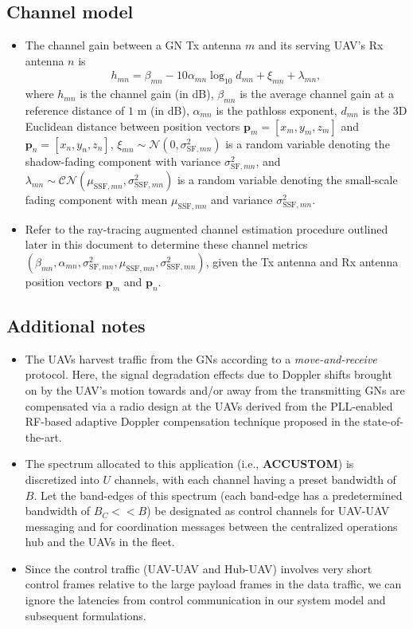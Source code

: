 \documentclass{article}
\begin{document}
\subsection{Channel model}
\begin{itemize}
    \item The channel gain between a GN Tx antenna $m$ and its serving UAV's Rx antenna $n$ is
    \begin{align}\label{Channel}
        h_{mn}{=}\beta_{mn}{-}10\alpha_{mn}\log_{10}d_{mn}{+}\xi_{mn}{+}\lambda_{mn},
    \end{align}
    where $h_{mn}$ is the channel gain (in dB), $\beta_{mn}$ is the average channel gain at a reference distance of $1$ m (in dB), $\alpha_{mn}$ is the pathloss exponent, $d_{mn}$ is the $3$D Euclidean distance between position vectors $\mathbf{p}_{m}{=}[x_{m},y_{m},z_{m}]$ and $\mathbf{p}_{n}{=}[x_{n},y_{n},z_{n}]$, $\xi_{mn}{\sim}\mathcal{N}\left(0,\sigma_{\mathrm{SF},mn}^{2}\right)$ is a random variable denoting the shadow-fading component with variance $\sigma_{\mathrm{SF},mn}^{2}$, and $\lambda_{mn}{\sim}\mathcal{CN}\left(\mu_{\mathrm{SSF},mn},\sigma_{\mathrm{SSF},mn}^{2}\right)$ is a random variable denoting the small-scale fading component with mean $\mu_{\mathrm{SSF},mn}$ and variance $\sigma_{\mathrm{SSF},mn}^{2}$.
    \item Refer to the ray-tracing augmented channel estimation procedure outlined later in this document to determine these channel metrics $\left(\beta_{mn},\alpha_{mn},\sigma_{\mathrm{SF},mn}^{2},\mu_{\mathrm{SSF},mn},\sigma_{\mathrm{SSF},mn}^{2}\right)$, given the Tx antenna and Rx antenna position vectors $\mathbf{p}_{m}$ and $\mathbf{p}_{n}$.
\end{itemize}

\subsection{Additional notes}
\begin{itemize}
    \item The UAVs harvest traffic from the GNs according to a \emph{move-and-receive} protocol. Here, the signal degradation effects due to Doppler shifts brought on by the UAV's motion towards and/or away from the transmitting GNs are compensated via a radio design at the UAVs derived from the PLL-enabled RF-based adaptive Doppler compensation technique proposed in the state-of-the-art.
    \item The spectrum allocated to this application (i.e., \textbf{ACCUSTOM}) is discretized into $U$ channels, with each channel having a preset bandwidth of $B$. Let the band-edges of this spectrum (each band-edge has a predetermined bandwidth of $B_{C}{<<}B$) be designated as control channels for UAV-UAV messaging and for coordination messages between the centralized operations hub and the UAVs in the fleet.
    \item Since the control traffic (UAV-UAV and Hub-UAV) involves very short control frames relative to the large payload frames in the data traffic, we can ignore the latencies from control communication in our system model and subsequent formulations.
\end{itemize}
\end{document}
